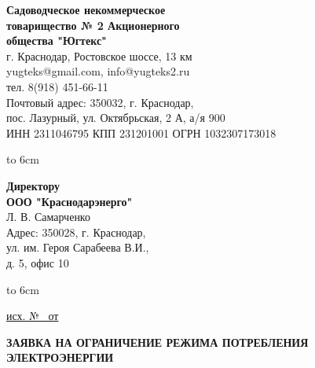 \noindent\parbox[l][71mm]{80mm}
{
	\begin{center}
		{\small \textbf{Садоводческое некоммерческое\\ товарищество
				№  2 Акционерного\\ общества "Югтекс"\\
		}}
		\footnotesize{г. Краснодар, Ростовское шоссе, 13 км\\
			yugteks@gmail.com, info@yugteks2.ru\\
			тел. 8(918) 451-66-11\\
			Почтовый адрес: 350032, г. Краснодар,\\ пос. Лазурный, ул. Октябрьская, 2 А, а/я   900
		}\\
		{ИНН 2311046795 КПП 231201001 ОГРН 1032307173018}
	\end{center}
	\hbox to 6cm{ }}\hfill
\parbox[l][71mm]{65mm}
{ \begin{center}
		\small{
			\textbf{Директору\\ ООО "Краснодарэнерго"}\\
			\vspace{3mm}
			Л. В. Самарченко\\
			\vspace{3mm}
			{\footnotesize Адрес: 350028, г. Краснодар,\\ ул. им. Героя Сарабеева В.И.,\\ д. 5, офис 10}
			
		}
	\end{center}
	\hbox to 6cm{ }}
\linebreak
\vspace{-13mm}

\underline{ исх. №  \,  от  } 

\vspace{6mm}
\begin{center}
	\textbf{ЗАЯВКА НА ОГРАНИЧЕНИЕ РЕЖИМА ПОТРЕБЛЕНИЯ ЭЛЕКТРОЭНЕРГИИ}
\end{center}
\par
\vspace{2mm}


